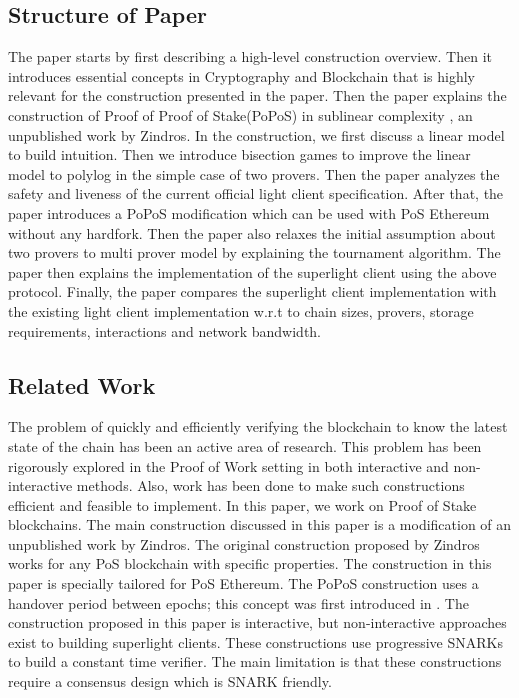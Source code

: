 \documentclass[a4paper,11pt,oneside]{article}
\theoremstyle{definition}
\begin{document}
  \subsection{Structure of Paper}
  The paper starts by first describing a high-level construction overview. Then it introduces essential concepts in Cryptography and Blockchain that is highly relevant for the construction presented in the paper. Then the paper explains the construction of Proof of Proof of Stake(PoPoS) in sublinear complexity \cite{PoPoS}, an unpublished work by Zindros. In the construction, we first discuss a linear model to build intuition. Then we introduce bisection games to improve the linear model to polylog in the simple case of two provers. Then the paper analyzes the safety and liveness of the current official light client specification. After that, the paper introduces a PoPoS modification which can be used with PoS Ethereum without any hardfork. Then the paper also relaxes the initial assumption about two provers to multi prover model by explaining the tournament algorithm. The paper then explains the implementation of the superlight client using the above protocol. Finally, the paper compares the superlight client implementation with the existing light client implementation w.r.t to chain sizes, provers, storage requirements, interactions and network bandwidth.
  
  \subsection{Related Work} 
  The problem of quickly and efficiently verifying the blockchain to know the latest state of the chain has been an active area of research. This problem has been rigorously explored in the Proof of Work setting \cite{NiPoPoW, PoPoW, 9152680} in both interactive and non-interactive methods. Also, work has been done to make such constructions efficient and feasible to implement\cite{cryptoeprint:2020:927,10.1145/3419614.3423255}. In this paper, we work on Proof of Stake blockchains. The main construction discussed in this paper is a modification of an unpublished work by Zindros\cite{PoPoS}. The original construction proposed by Zindros works for any PoS blockchain with specific properties. The construction in this paper is specially tailored for PoS Ethereum. The PoPoS construction uses a handover period between epochs; this concept was first introduced in \cite{8835275}. The construction proposed in this paper is interactive, but non-interactive approaches exist to building superlight clients. These constructions use progressive SNARKs to build a constant time verifier\cite{Coda,Mina,Plumo}. The main limitation is that these constructions require a consensus design which is SNARK friendly.  
  
\end{document}
